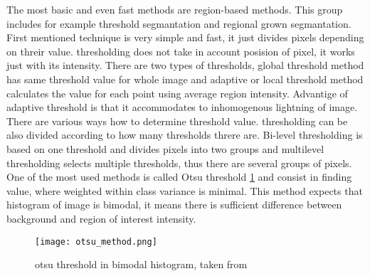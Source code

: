         The most basic and even fast methods are region-based methods. This group includes for example threshold segmantation and regional grown segmantation.
        First mentioned technique is very simple and fast, it just divides pixels depending on threir value. thresholding does not take in account posision of pixel,
        it works just with its intensity. There are two types of thresholds, global threshold method has same threshold value for whole image and adaptive or local
        threshold method calculates the value for each point using average region intensity. Advantige of adaptive threshold is that it accommodates to inhomogenous
        lightning of image. There are various ways how to determine threshold value. thresholding can be also divided according to how many thresholds threre are.
        Bi-level thresholding is based on one threshold and divides pixels into two groups and multilevel thresholding selects multiple thresholds, thus there are several groups of pixels.
        One of the most used methods is called Otsu threshold \ref{fig:otsu} and consist in finding value, where weighted within class variance is minimal. This method expects that histogram of image
        is bimodal, it means there is sufficient difference between background and region of interest intensity. \cite{15, 16, 17, 18}
        
        \begin{figure}[h]
            \texttt{[image: otsu\_method.png]}
            \caption{otsu threshold in bimodal histogram, taken from \cite{20}}
            \label{fig:otsu}
        \end{figure}

